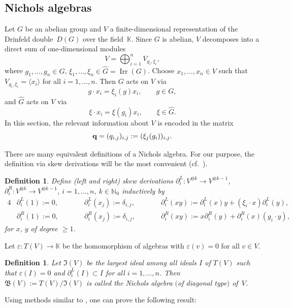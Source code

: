 \documentclass[10pt,a4paper]{amsart}
\numberwithin{equation}{section}
\newtheorem{Definition}[Theorem]{Definition}
\newcommand{\NN }{\mathbb{N}}
\newcommand{\qq }{{\bf q}}
\newcommand{\KK }{\mathbb{K}}
\DeclareMathOperator{\Irr}{Irr}
\newcommand{\del }{\partial^L}
\newcommand{\der }{\partial^R}
\newcommand{\BB }{\mathfrak{B}}
\newcommand{\II }{\mathfrak{I}}
\begin{document}
\subsection{Nichols algebras}\label{sec: Nichols algebras}

Let $G$ be an abelian group and $V$ a finite-dimensional representation of the Drinfeld double~$D(G)$ over the field~$\KK$. Since $G$ is abelian, $V$ decomposes into a direct sum of one-dimensional modules%
\[ V = \bigoplus_{i=1}^n V_{g_i,\xi_i}, \]
where $g_1,\dots,g_n\in G$, $\xi_1,\dots,\xi_n\in \hat G=\Irr(G)$. Choose $x_1,\dots,x_n\in V$ such that $V_{g_i,\xi_i}=\langle x_i\rangle$ for all $i=1,\dots,n$.
Then $G$ acts on $V$ via
\[
g\cdot x_i = \xi_i(g) x_i, \qquad g\in G,
\]
and $\hat G$ acts on $V$ via
\[
\xi\cdot x_i = \xi(g_i) x_i, \qquad \xi\in \hat G.
\]
In this section, the relevant information about $V$ is encoded in the matrix
\[ \qq = (q_{i,j})_{i,j} := (\xi_j(g_i))_{i,j}. \]

There are many equivalent definitions of a Nichols algebra. For our purpose, the definition via skew derivations will be the most convenient (cf.~\cite{p-H-06}).

\begin{Definition}
Define (left and right) {\it skew derivations}
$\del_i \colon V^{\otimes k}\rightarrow V^{\otimes k-1}$,
$\der_i \colon V^{\otimes k}\rightarrow V^{\otimes k-1}$,
$i=1,\dots,n$, $k\in\NN_0$ inductively by
\begin{alignat*}{4}
& \del_i(1):=0, \qquad &&\del_i(x_j):=\delta_{i,j}, \qquad&&
\del_i(xy):=\del_i(x)y + (\xi_i\cdot x) \del_i(y),&\\
& \der_i(1):=0, \qquad &&\der_i(x_j):=\delta_{i,j}, \qquad&&
\der_i(xy):=x\der_i(y) + \der_i(x) (g_i \cdot y),&
\end{alignat*}
for $x$, $y$ of degree $\ge 1$.
\end{Definition}

Let $\varepsilon \colon T(V) \rightarrow \KK$ be the homomorphism of algebras with $\varepsilon(v)=0$ for all $v\in V$.

\begin{Definition}
Let $\II(V)$ be the largest ideal among all ideals $I$ of $T(V)$ such that $\varepsilon(I)=0$ and
$\del_i(I)\subset I$ for all $i=1,\dots,n$.
Then $\BB(V):=T(V)/\II(V)$ is called the {\it Nichols algebra $($of diagonal type$)$} of~$V$.
\end{Definition}

Using methods similar to \cite[Lemma~2.2]{p-J-77}, one can prove the following result:
\end{document}
